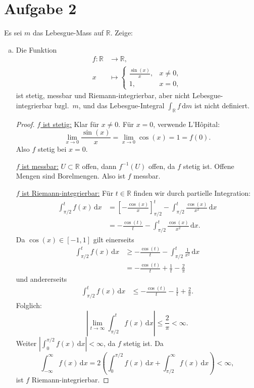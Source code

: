 \documentclass[10pt]{article}\usepackage[]{graphicx}\usepackage[]{color}
\newcommand{\R}{\mathbb{R}}
\newcommand{\df}{\,\textrm{d}}
\begin{document}
\section*{Aufgabe 2}
Es sei $m$ das Lebesgue-Mass auf $\R$.
Zeige:
\begin{enumerate}[(a)]
  \item Die Funktion
  \begin{align*}
    f: \R &\to \R,\\
    x &\mapsto
    \begin{cases}
      \frac{\sin(x)}{x}, & x \neq 0, \\
      1, & x = 0,
    \end{cases}
  \end{align*}
  ist stetig, messbar und Riemann-integrierbar, aber nicht Lebesgue-integrierbar bzgl.\ $m$,
  und das Lebesgue-Integral $\int_{\R} f \df m$ ist nicht definiert.
  \begin{proof}
    \uline{$f$ ist stetig:} Klar für $x \neq 0$. Für $x = 0$, verwende L'Hôpital:
    \[
      \lim_{x \to 0} \frac{\sin(x)}{x} = \lim_{x \to 0} \cos(x) = 1 = f(0).
    \]
    Also $f$ stetig bei $x = 0$.

    \uline{$f$ ist messbar:} $U \subset \R$ offen, dann $f^{-1}(U)$ offen,
    da $f$ stetig ist. Offene Mengen sind Borelmengen. Also ist $f$ messbar.

    \uline{$f$ ist Riemann-integrierbar:}
    Für $t \in \R$ finden wir durch partielle Integration:
    \begin{align*}
    \int_{\pi/2}^t f(x) \df x
    &= \left[-\frac{\cos(x)}{x}\right]^t_{\pi/2} - \int_{\pi/2}^t \frac{\cos(x)}{x^2} \df x \\
    &= -\frac{\cos(t)}{t} - \int_{\pi/2}^t \frac{\cos(x)}{x^2} \df x.
    \end{align*}
    Da $\cos(x) \in [-1,1]$ gilt einerseits
    \begin{align*}
      \int_{\pi/2}^t f(x) \df x
      &\geq -\frac{\cos(t)}{t} - \int_{\pi/2}^t \frac{1}{x^2} \df x \\
      &= -\frac{\cos(t)}{t} + \frac{1}{t} - \frac{2}{\pi}
    \end{align*}
    und andererseits
    \begin{align*}
       \int_{\pi/2}^t f(x) \df x  &\leq -\frac{\cos(t)}{t} - \frac{1}{t} + \frac{2}{\pi}.
    \end{align*}
    Folglich:
    \[
      \left|\lim_{t \to \infty} \int_{\pi/2}^t f(x) \df x\right| \leq \frac{2}{\pi} < \infty.
    \]
    Weiter $|\int_0^{\pi/2} f(x) \df x| < \infty$, da $f$ stetig ist.
    Da
    \[\int_{-\infty}^{\infty}f(x) \df x = 2\left(\int_0^{\pi/2} f(x) \df x + \int_{\pi/2}^{\infty} f(x) \df x\right) < \infty,\]
    ist $f$ Riemann-integrierbar.


\end{proof}
\end{enumerate}
\end{document}
